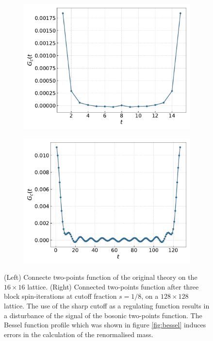 \begin{figure}
    \centering 
    \begin{subfigure}{0.47\textwidth}
        \includegraphics[width=\textwidth]{figures/conn2ptf16.pdf}
    \end{subfigure}
    \begin{subfigure}{0.47\textwidth}
        \includegraphics[width=\textwidth]{figures/conn2ptf128.pdf}
    \end{subfigure}
    \caption[Effect of the sharp cutoff on the connected two-points function]{(Left) Connecte two-points function of the original theory on the $16 \times 16$ lattice. (Right) Connected two-points function after three block spin-iterations at cutoff fraction $s=1/8$, on a $128 \times 128$ lattice. The use of the sharp cutoff as a regulating function results in a disturbance of the signal of the bosonic two-points function. The Bessel function profile which was shown in figure \ref{fig:bessel} induces errors in the calculation of the renormalised mass.}
    \label{fig:connected_2ptf}
\end{figure} \\
